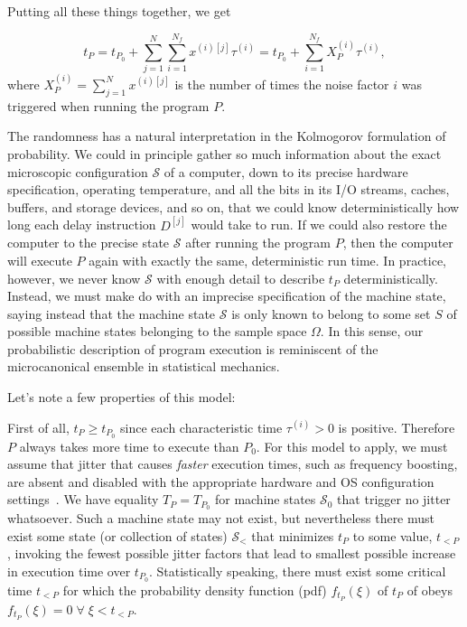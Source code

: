 \documentclass[conference]{IEEEtran}
\begin{document}
Putting all these things together, we get

\begin{equation}
t_P = t_{P_0} + \sum_{j=1}^N \sum_{i=1}^{N_f} x^{(i)[j]} \tau^{(i)}
= t_{P_0} + \sum_{i=1}^{N_f} X_P^{(i)} \tau^{(i)},
\end{equation}
%
where $X_P^{(i)} = \sum_{j=1}^N x^{(i)[j]}$ is the number of times the noise factor $i$ was triggered when running the program $P$.

The randomness has a natural interpretation in the Kolmogorov formulation of probability. We could in principle gather so much information about the exact microscopic configuration $\mathcal S$ of a computer, down to its precise hardware specification, operating temperature, and all the bits in its I/O streams, caches, buffers, and storage devices, and so on, that we could know deterministically how long each delay instruction $D^{[j]}$ would take to run. If we could also restore the computer to the precise state $\mathcal S$ after running the program $P$, then the computer will execute $P$ again with exactly the same, deterministic run time. In practice, however, we never know $\mathcal S$ with enough detail to describe $t_P$ deterministically. Instead, we must make do with an imprecise specification of the machine state, saying instead that the machine state $\mathcal S$ is only known to belong to some set $S$ of possible machine states belonging to the sample space $\Omega$. In this sense, our probabilistic description of program execution is reminiscent of the microcanonical ensemble in statistical mechanics.

Let's note a few properties of this model:

First of all, $t_P \ge t_{P_0}$ since each characteristic time $\tau^{(i)} > 0$ is positive. Therefore $P$ always takes more time to execute than $P_0$.
For this model to apply, we must assume that jitter that causes \textit{faster}
execution times, such as frequency boosting, are absent and disabled with the
appropriate hardware and OS configuration settings~\cite{benchmarktoolschecklist}. We have equality $T_P = T_{P_0}$
for machine states $\mathcal S_0$ that trigger no jitter whatsoever. Such a machine state may not exist, but nevertheless there must exist some state (or collection of states) $\mathcal S_<$ that minimizes $t_P$ to some value, $t_{<P}$, invoking the fewest possible jitter factors that lead to smallest possible increase in execution time over $t_{P_0}$.
Statistically speaking, there must exist some critical time $t_{<P}$ for which the probability density function (pdf) $f_{t_P}(\xi)$ of $t_P$ of obeys $f_{t_P}(\xi) = 0 \; \forall \; \xi < t_{<P}$.
\end{document}
